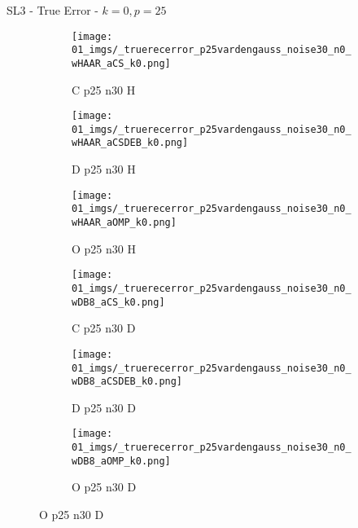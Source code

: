 \begin{frame}{SL3 - True Error - $k=0,p=25$}{}
\begin{figure}
\vspace{5pt}

\begin{subfigure}{0.13\textwidth}
\texttt{[image: 01\_imgs/\_truerecerror\_p25vardengauss\_noise30\_n0\_wHAAR\_aCS\_k0.png]}
\caption*{\tiny C p25 n30 H}
\end{subfigure}
\begin{subfigure}{0.13\textwidth}
\texttt{[image: 01\_imgs/\_truerecerror\_p25vardengauss\_noise30\_n0\_wHAAR\_aCSDEB\_k0.png]}
\caption*{\tiny D p25 n30 H}
\end{subfigure}
\begin{subfigure}{0.13\textwidth}
\texttt{[image: 01\_imgs/\_truerecerror\_p25vardengauss\_noise30\_n0\_wHAAR\_aOMP\_k0.png]}
\caption*{\tiny O p25 n30 H}
\end{subfigure}
\begin{subfigure}{0.13\textwidth}
\texttt{[image: 01\_imgs/\_truerecerror\_p25vardengauss\_noise30\_n0\_wDB8\_aCS\_k0.png]}
\caption*{\tiny C p25 n30 D}
\end{subfigure}
\begin{subfigure}{0.13\textwidth}
\texttt{[image: 01\_imgs/\_truerecerror\_p25vardengauss\_noise30\_n0\_wDB8\_aCSDEB\_k0.png]}
\caption*{\tiny D p25 n30 D}
\end{subfigure}
\begin{subfigure}{0.13\textwidth}
\texttt{[image: 01\_imgs/\_truerecerror\_p25vardengauss\_noise30\_n0\_wDB8\_aOMP\_k0.png]}
\caption*{\tiny O p25 n30 D}
\end{subfigure}
\end{figure}
\end{frame}


